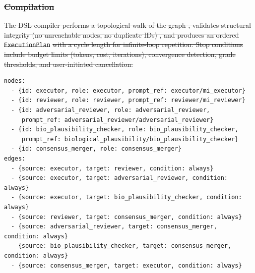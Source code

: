 \documentclass[10pt,letterpaper]{article}
\providecommand{\DIFdeltex}[1]{{\protect\color{red}\sout{#1}}}                      %
\providecommand{\DIFaddbegin}{} %
\providecommand{\DIFaddend}{} %
\providecommand{\DIFdelbegin}{} %
\providecommand{\DIFdelend}{} %
\providecommand{\DIFdel}[1]{\texorpdfstring{\DIFdeltex{#1}}{}} %
\newcommand{\DIFscaledelfig}{0.5}
\newlength{\DIFdelgraphicswidth} %
\newlength{\DIFdelgraphicsheight} %
\newcommand{\DIFaddincludegraphics}[2][]{{\color{blue}\fbox{\DIFOincludegraphics[#1]{#2}}}} %
\newcommand{\DIFdelincludegraphics}[2][]{%
\sbox{\DIFdelgraphicsbox}{\DIFOincludegraphics[#1]{#2}}%
\settoboxwidth{\DIFdelgraphicswidth}{\DIFdelgraphicsbox} %
\settoboxtotalheight{\DIFdelgraphicsheight}{\DIFdelgraphicsbox} %
\scalebox{\DIFscaledelfig}{%
\parbox[b]{\DIFdelgraphicswidth}{\usebox{\DIFdelgraphicsbox}\\[-\baselineskip] \rule{\DIFdelgraphicswidth}{0em}}\llap{\resizebox{\DIFdelgraphicswidth}{\DIFdelgraphicsheight}{%
\setlength{\unitlength}{\DIFdelgraphicswidth}%
\begin{picture}(1,1)%
\thicklines\linethickness{2pt} %
{\color[rgb]{1,0,0}\put(0,0){\framebox(1,1){}}}%
{\color[rgb]{1,0,0}\put(0,0){\line( 1,1){1}}}%
{\color[rgb]{1,0,0}\put(0,1){\line(1,-1){1}}}%
\end{picture}%
}\hspace*{3pt}}} %
} %
\DeclareRobustCommand{\DIFaddbegin}{\DIFOaddbegin \let\includegraphics\DIFaddincludegraphics} %
\DeclareRobustCommand{\DIFaddend}{\DIFOaddend \let\includegraphics\DIFOincludegraphics} %
\DeclareRobustCommand{\DIFdelbegin}{\DIFOdelbegin \let\includegraphics\DIFdelincludegraphics} %
\DeclareRobustCommand{\DIFdelend}{\DIFOaddend \let\includegraphics\DIFOincludegraphics} %
\begin{document}
\DIFdelbegin \subsubsection*{\DIFdel{Compilation}}
\DIFdel{The DSL compiler performs a topological walk of the graph , validates structural integrity (no unreachable nodes, no duplicate IDs) , and produces an ordered }\texttt{\DIFdel{ExecutionPlan}} %
\DIFdel{with a cycle length for infinite-loop repetition. Stop conditions include budget limits (tokens, cost, iterations), convergence detection, grade thresholds, and user-initiated cancellation.
}\DIFdelend \DIFaddbegin \begin{lstlisting}
nodes:
  - {id: executor, role: executor, prompt_ref: executor/mi_executor}
  - {id: reviewer, role: reviewer, prompt_ref: reviewer/mi_reviewer}
  - {id: adversarial_reviewer, role: adversarial_reviewer,
     prompt_ref: adversarial_reviewer/adversarial_reviewer}
  - {id: bio_plausibility_checker, role: bio_plausibility_checker,
     prompt_ref: biological_plausibility/bio_plausibility_checker}
  - {id: consensus_merger, role: consensus_merger}
edges:
  - {source: executor, target: reviewer, condition: always}
  - {source: executor, target: adversarial_reviewer, condition: always}
  - {source: executor, target: bio_plausibility_checker, condition: always}
  - {source: reviewer, target: consensus_merger, condition: always}
  - {source: adversarial_reviewer, target: consensus_merger, condition: always}
  - {source: bio_plausibility_checker, target: consensus_merger, condition: always}
  - {source: consensus_merger, target: executor, condition: always}
\end{lstlisting}
\DIFaddend 
\end{document}
